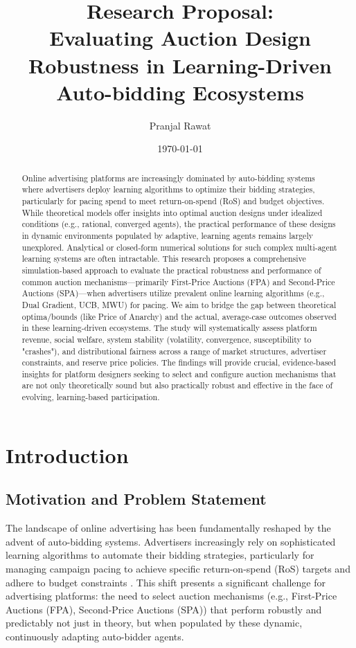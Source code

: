 \documentclass[12pt, a4paper]{article}
\title{\textbf{Research Proposal: \\ Evaluating Auction Design Robustness in Learning-Driven Auto-bidding Ecosystems}}
\author{Pranjal Rawat}
\date{\today}
\begin{document}
\maketitle
\begin{abstract}
Online advertising platforms are increasingly dominated by auto-bidding systems where advertisers deploy learning algorithms to optimize their bidding strategies, particularly for pacing spend to meet return-on-spend (RoS) and budget objectives. While theoretical models offer insights into optimal auction designs under idealized conditions (e.g., rational, converged agents), the practical performance of these designs in dynamic environments populated by adaptive, learning agents remains largely unexplored. Analytical or closed-form numerical solutions for such complex multi-agent learning systems are often intractable. This research proposes a comprehensive simulation-based approach to evaluate the practical robustness and performance of common auction mechanisms—primarily First-Price Auctions (FPA) and Second-Price Auctions (SPA)—when advertisers utilize prevalent online learning algorithms (e.g., Dual Gradient, UCB, MWU) for pacing. We aim to bridge the gap between theoretical optima/bounds (like Price of Anarchy) and the actual, average-case outcomes observed in these learning-driven ecosystems. The study will systematically assess platform revenue, social welfare, system stability (volatility, convergence, susceptibility to "crashes"), and distributional fairness across a range of market structures, advertiser constraints, and reserve price policies. The findings will provide crucial, evidence-based insights for platform designers seeking to select and configure auction mechanisms that are not only theoretically sound but also practically robust and effective in the face of evolving, learning-based participation.
\end{abstract}

\newpage
\tableofcontents
\newpage
\onehalfspacing %

\section{Introduction}

\subsection{Motivation and Problem Statement}
The landscape of online advertising has been fundamentally reshaped by the advent of auto-bidding systems. Advertisers increasingly rely on sophisticated learning algorithms to automate their bidding strategies, particularly for managing campaign pacing to achieve specific return-on-spend (RoS) targets and adhere to budget constraints \cite{Aggarwal2019, Aggarwal2024Survey}. This shift presents a significant challenge for advertising platforms: the need to select auction mechanisms (e.g., First-Price Auctions (FPA), Second-Price Auctions (SPA)) that perform robustly and predictably not just in theory, but when populated by these dynamic, continuously adapting auto-bidder agents.
\end{document}
